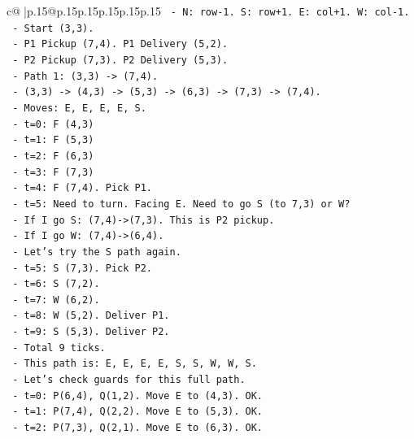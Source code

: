 \documentclass{article}
\begin{document}
{\begin{supertabular}{c@{$\;$}|p{.15\linewidth}@{}p{.15\linewidth}p{.15\linewidth}p{.15\linewidth}p{.15\linewidth}p{.15\linewidth}}
{{{\texttt{            {-} N: row{-}1. S: row+1. E: col+1. W: col{-}1.} \\
\texttt{            {-} Start (3,3).} \\
\texttt{            {-} P1 Pickup (7,4). P1 Delivery (5,2).} \\
\texttt{            {-} P2 Pickup (7,3). P2 Delivery (5,3).} \\
\texttt{            {-} Path 1: (3,3) {-}> (7,4).} \\
\texttt{              {-} (3,3) {-}> (4,3) {-}> (5,3) {-}> (6,3) {-}> (7,3) {-}> (7,4).} \\
\texttt{              {-} Moves: E, E, E, E, S.} \\
\texttt{              {-} t=0: F (4,3)} \\
\texttt{              {-} t=1: F (5,3)} \\
\texttt{              {-} t=2: F (6,3)} \\
\texttt{              {-} t=3: F (7,3)} \\
\texttt{              {-} t=4: F (7,4). Pick P1.} \\
\texttt{              {-} t=5: Need to turn. Facing E. Need to go S (to 7,3) or W?} \\
\texttt{              {-} If I go S: (7,4){-}>(7,3). This is P2 pickup.} \\
\texttt{              {-} If I go W: (7,4){-}>(6,4).} \\
\texttt{              {-} Let's try the S path again.} \\
\texttt{              {-} t=5: S (7,3). Pick P2.} \\
\texttt{              {-} t=6: S (7,2).} \\
\texttt{              {-} t=7: W (6,2).} \\
\texttt{              {-} t=8: W (5,2). Deliver P1.} \\
\texttt{              {-} t=9: S (5,3). Deliver P2.} \\
\texttt{              {-} Total 9 ticks.} \\
\texttt{              {-} This path is: E, E, E, E, S, S, W, W, S.} \\
\texttt{              {-} Let's check guards for this full path.} \\
\texttt{              {-} t=0: P(6,4), Q(1,2). Move E to (4,3). OK.} \\
\texttt{              {-} t=1: P(7,4), Q(2,2). Move E to (5,3). OK.} \\
\texttt{              {-} t=2: P(7,3), Q(2,1). Move E to (6,3). OK.} \\
}}}
\end{supertabular}}
\end{document}
